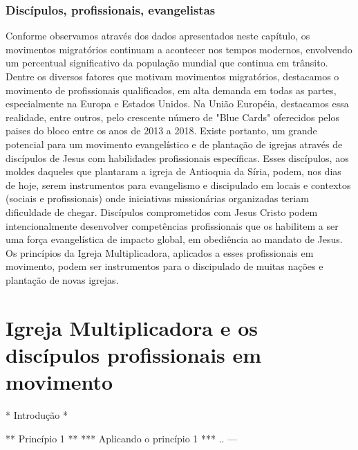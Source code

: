 \documentclass[
	12pt,				%
	openright,			%
	twoside,			%
	a4paper,			%
	english,			%
	french,				%
	spanish,			%
	brazil				%
	]{abntex2}
\begin{document}
\subsection{Discípulos, profissionais, evangelistas}

Conforme observamos através dos dados apresentados neste capítulo, os movimentos migratórios continuam a acontecer nos tempos modernos, envolvendo um percentual significativo da população mundial que continua em trânsito. Dentre os diversos fatores que motivam movimentos migratórios, destacamos o movimento de profissionais qualificados, em alta demanda em todas as partes, especialmente na Europa e Estados Unidos. Na União Européia, destacamos essa realidade, entre outros, pelo crescente número de "Blue Cards" oferecidos pelos paises do bloco entre os anos de 2013 a 2018. Existe portanto, um grande potencial para um movimento evangelístico e de plantação de igrejas através de discípulos de Jesus com habilidades profissionais específicas. Esses discípulos, aos moldes daqueles que plantaram a igreja de Antioquia da Síria, podem, nos dias de hoje, serem instrumentos para evangelismo e discipulado em locais e contextos (sociais e profissionais) onde iniciativas missionárias organizadas teriam dificuldade de chegar. Discípulos comprometidos com Jesus Cristo podem intencionalmente desenvolver competências profissionais que os habilitem a ser uma força evangelística de impacto global, em obediência ao mandato de Jesus. Os princípios da Igreja Multiplicadora, aplicados a esses profissionais em movimento, podem ser instrumentos para o discipulado de muitas nações e plantação de novas igrejas.

\chapter{Igreja Multiplicadora e os discípulos profissionais em movimento}

* Introdução *



** Princípio 1 ** 
*** Aplicando o princípio 1 ***
..
---





\end{document}
